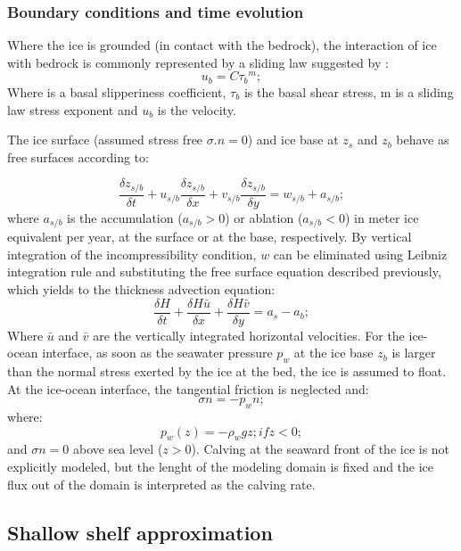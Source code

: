 \documentclass{article}
\begin{document}
\subsubsection{Boundary conditions and time evolution}
Where the ice is grounded (in contact with the bedrock), the interaction of ice with bedrock is commonly represented by a sliding law suggested by \cite{weertman1974stability}:
\begin{equation}
	u_b=C{\tau_b}^m;
\end{equation}
Where is a basal slipperiness coefficient, $\tau_b$ is the basal shear stress, m is a sliding law stress exponent and $u_b$ is the velocity. 

The ice surface (assumed stress free $\sigma .n=0$) and ice base at $z_s$ and $z_b$ behave as free surfaces according to:

\begin{equation}
	\frac{\delta z_{s/b}}{\delta t}+u_{s/b}\frac{\delta z_{s/b}}{\delta x}+v_{s/b}\frac{\delta z_{s/b}}{\delta y}=w_{s/b}+a_{s/b};
\end{equation}
where $a_{s/b}$ is the accumulation ($a_{s/b}>0$) or ablation ($a_{s/b}<0$) in meter ice equivalent per year, at the surface or at the base, respectively. By vertical integration of the incompressibility condition, $w$ can be eliminated using Leibniz integration rule and substituting the free surface equation described previously, which yields to the thickness advection equation:
\begin{equation}
	\frac{\delta H}{\delta t}+\frac{\delta H\bar{u}}{\delta x}+\frac{\delta H \bar{v}}{\delta y}=a_s-a_b ;
\end{equation}
Where $\bar{u}$ and $\bar{v}$ are the vertically integrated horizontal velocities. 
For the ice-ocean interface, as soon as the seawater pressure $p_w$ at the ice base $z_b$ is larger than the normal stress exerted by the ice at the bed, the ice is assumed to float. At the ice-ocean interface, the tangential friction is neglected and:
\begin{equation}
	\sigma  n=-p_wn ;
\end{equation}
where:
\begin{equation}
	p_w(z)=-\rho_wgz; if z<0;
\end{equation}
and $\sigma n=0$ above sea level ($z>0$). Calving at the seaward front of the ice is not explicitly modeled, but the lenght of the modeling domain is fixed and the ice flux out of the domain is interpreted as the calving rate.
  
\subsection{Shallow shelf approximation}
\end{document}
